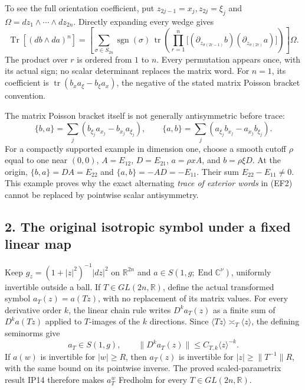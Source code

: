 \documentclass[
  11pt,
]{article}
\begin{document}
To see the full orientation coefficient, put
\(z_{2j-1}=x_j,z_{2j}=\xi_j\) and
\(\Omega=dz_1\wedge\cdots\wedge dz_{2n}\). Directly expanding every
wedge gives \[
 \operatorname{Tr}[(db\wedge da)^n]
 =\left[
 \sum_{\sigma\in S_{2n}}\operatorname{sgn}(\sigma)\,
 \operatorname{tr}\!\left(
   \prod_{r=1}^{n}
    \bigl[(\partial_{z_{\sigma(2r-1)}}b)
          (\partial_{z_{\sigma(2r)}}a)\bigr]\right)
  \right]\Omega .
 \tag{EF3}
\] The product over \(r\) is ordered from \(1\) to \(n\). Every
permutation appears once, with its actual sign; no scalar determinant
replaces the matrix word. For \(n=1\), its coefficient is
\(\operatorname{tr}(b_xa_\xi-b_\xi a_x)\), the negative of the stated
matrix Poisson bracket convention.

The matrix Poisson bracket itself is not generally antisymmetric before
trace: \[
 \{b,a\}
  =\sum_j(b_{\xi_j}a_{x_j}-b_{x_j}a_{\xi_j}),
 \qquad
 \{a,b\}
  =\sum_j(a_{\xi_j}b_{x_j}-a_{x_j}b_{\xi_j}).
 \tag{EF4}
\] For a compactly supported example in dimension one, choose a smooth
cutoff \(\rho\) equal to one near \((0,0)\), \(A=E_{12}\), \(D=E_{21}\),
\(a=\rho xA\), and \(b=\rho\xi D\). At the origin, \(\{b,a\}=DA=E_{22}\)
and \(\{a,b\}=-AD=-E_{11}\). Their sum \(E_{22}-E_{11}\ne0\). This
example proves why the exact alternating \emph{trace of exterior words}
in (EF2) cannot be replaced by pointwise scalar antisymmetry.

\subsection{2. The original isotropic symbol under a fixed linear
map}\label{the-original-isotropic-symbol-under-a-fixed-linear-map}

Keep \(g_z=(1+|z|^2)^{-1}|dz|^2\) on \(\mathbb R^{2n}\) and
\(a\in S(1,g;\operatorname{End}\mathbb C^\nu)\), uniformly invertible
outside a ball. If \(T\in GL(2n,\mathbb R)\), define the actual
transformed symbol \(a_T(z)=a(Tz)\), with no replacement of its matrix
values. For every derivative order \(k\), the linear chain rule writes
\(D^k a_T(z)\) as a finite sum of \(D^k a(Tz)\) applied to \(T\)-images
of the \(k\) directions. Since
\(\langle Tz\rangle\asymp_T\langle z\rangle\), the defining seminorms
give \[
 a_T\in S(1,g),\qquad
 \|D^k a_T(z)\|
       \le C_{T,k}\langle z\rangle^{-k}.
 \tag{LS1}
\] If \(a(w)\) is invertible for \(|w|\ge R\), then \(a_T(z)\) is
invertible for \(|z|\ge\|T^{-1}\|R\), with the same bound on its
pointwise inverse. The proved scaled-parametrix result IP14 therefore
makes \(a_T^w\) Fredholm for every \(T\in GL(2n,\mathbb R)\).
\end{document}
